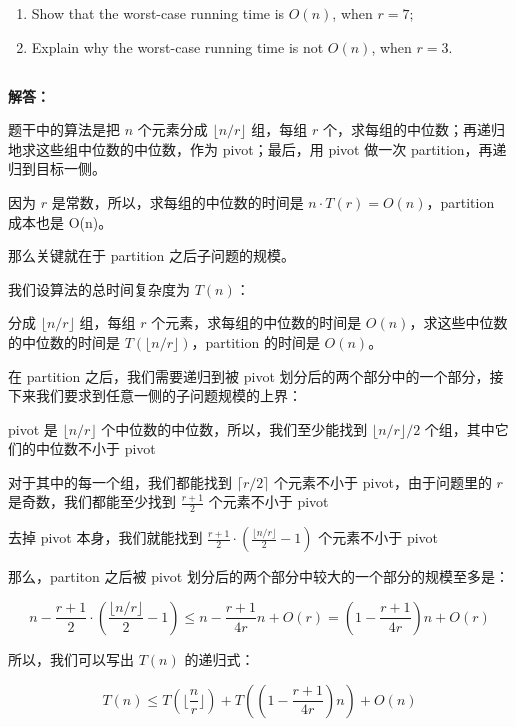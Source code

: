 ﻿\documentclass[12pt,a4paper]{article}
\begin{document}
\begin{enumerate}[label=(\alph*)]
    \item Show that the worst-case running time is $O(n)$, when $r=7$;
    \item Explain why the worst-case running time is not $O(n)$, when $r=3$.
\end{enumerate}

\subsection{}

\begin{answerbox}
\textbf{解答：}

题干中的算法是把 $n$ 个元素分成 $\lfloor n/r \rfloor$ 组，每组 $r$ 个，求每组的中位数；再递归地求这些组中位数的中位数，作为 pivot；最后，用 pivot 做一次 partition，再递归到目标一侧。

因为 $r$ 是常数，所以，求每组的中位数的时间是 $n \cdot T(r) = O(n)$，partition 成本也是 O(n)。

那么关键就在于 partition 之后子问题的规模。

我们设算法的总时间复杂度为 $T(n)$：

分成 $\lfloor n/r \rfloor$ 组，每组 $r$ 个元素，求每组的中位数的时间是 $O(n)$，求这些中位数的中位数的时间是 $T(\lfloor n/r \rfloor)$，partition 的时间是 $O(n)$。

在 partition 之后，我们需要递归到被 pivot 划分后的两个部分中的一个部分，接下来我们要求到任意一侧的子问题规模的上界：

pivot 是 $\lfloor n/r \rfloor$ 个中位数的中位数，所以，我们至少能找到 $\lfloor n/r \rfloor / 2$ 个组，其中它们的中位数不小于 pivot

对于其中的每一个组，我们都能找到 $\lceil r/2 \rceil$ 个元素不小于 pivot，由于问题里的 $r$ 是奇数，我们都能至少找到 $\frac{r+1}{2}$ 个元素不小于 pivot

去掉 pivot 本身，我们就能找到 $\frac{r+1}{2} \cdot (\frac{\lfloor n/r \rfloor}{2} - 1)$ 个元素不小于 pivot

那么，partiton 之后被 pivot 划分后的两个部分中较大的一个部分的规模至多是：

$$
n - \frac{r+1}{2} \cdot \left( \frac{\lfloor n/r \rfloor}{2} - 1 \right) \leq n - \frac{r+1}{4r} n + O(r) = \left( 1 - \frac{r+1}{4r} \right) n + O(r)
$$

所以，我们可以写出 $T(n)$ 的递归式：

$$
T(n) \leq T(\lfloor \frac{n}{r} \rfloor) + T\left( \left( 1 - \frac{r+1}{4r} \right) n \right) + O(n)
$$


\end{answerbox}
\end{document}
